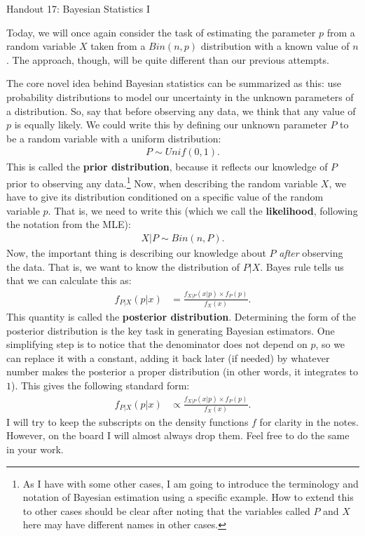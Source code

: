 \documentclass{tufte-handout}
\begin{document}
\justify

{\LARGE Handout 17: Bayesian Statistics I}

\vspace*{18pt}

\noindent
Today, we will once again consider the task of estimating the 
parameter $p$ from a random variable $X$ taken from a $Bin(n, p)$
distribution with a known value of $n$. The approach, though,
will be quite different than our previous attempts. 

The core novel idea behind Bayesian statistics can be summarized
as this: use probability distributions to model our uncertainty in
the unknown parameters of a distribution. So, say that before 
observing any data, we think that any value of $p$ is equally
likely. We could write this by defining our unknown parameter $P$
to be a random variable with a uniform distribution:
\begin{align*}
P \sim Unif(0, 1).
\end{align*}
This is called the \textbf{prior distribution}, because it reflects
our knowledge of $P$ prior to observing any data.\footnote{
  As I have with some other cases, I am going to introduce the
  terminology and notation of Bayesian estimation using a specific
  example. How to extend this to other cases should be clear after
  noting that the variables called $P$ and $X$ here may have different
  names in other cases.
}
Now, when describing
the random variable $X$, we have to give its distribution conditioned
on a specific value of the random variable $p$. That is, we need to
write this (which we call the \textbf{likelihood}, following the notation
from the MLE):
\begin{align*}
X|P \sim Bin(n, P).
\end{align*}
Now, the important thing is describing our knowledge about $P$ \textit{after}
observing the data. That is, we want to know the distribution of $P | X$.
Bayes rule tells us that we can calculate this as:
\begin{align*}
f_{P|X}(p|x) &= \frac{f_{X|P}(x|p) \times f_{P}(p)}{f_{X}(x)}.
\end{align*}
This quantity is called the \textbf{posterior distribution}. Determining
the form of the posterior distribution is the key task in generating
Bayesian estimators. One simplifying step is to notice that the denominator
does not depend on $p$, so we can replace it with a constant, adding it
back later (if needed) by whatever number makes the posterior a proper
distribution (in other words, it integrates to $1$). This gives the following
standard form:
\begin{align*}
f_{P|X}(p|x) &\propto \frac{f_{X|P}(x|p) \times f_{P}(p)}{f_{X}(x)}.
\end{align*}
I will try to keep the subscripts on the density functions $f$
for clarity in the notes. However, on the board I will almost always drop
them. Feel free to do the same in your work.
\end{document}
